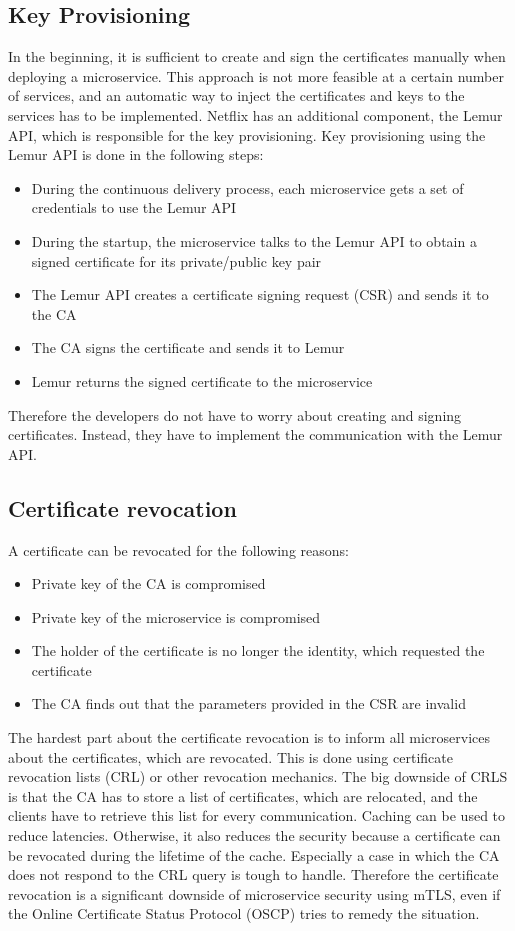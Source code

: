 \subsection{Key Provisioning}
In the beginning, it is sufficient to create and sign the certificates manually when deploying a microservice.
This approach is not more feasible at a certain number of services, and an automatic way to inject the certificates and keys to the services has to be implemented.
Netflix has an additional component, the Lemur API, which is responsible for the key provisioning. Key provisioning using the Lemur API is done in the following steps\cite{dias2020microservices}: %
\begin{itemize}
    \item During the continuous delivery process, each microservice gets a set of credentials to use the Lemur API
    \item During the startup, the microservice talks to the Lemur API to obtain a signed certificate for its private/public key pair
    \item The Lemur API creates a certificate signing request (CSR) and sends it to the CA
    \item The CA signs the certificate and sends it to Lemur
    \item Lemur returns the signed certificate to the microservice
\end{itemize}
Therefore the developers do not have to worry about creating and signing certificates. Instead, they have to implement the communication with the Lemur API.

\subsection{Certificate revocation}
A certificate can be revocated for the following reasons: 
\begin{itemize}
    \item Private key of the CA is compromised
    \item Private key of the microservice is compromised
    \item The holder of the certificate is no longer the identity, which requested the certificate 
    \item The CA finds out that the parameters provided in the CSR are invalid
\end{itemize}
The hardest part about the certificate revocation is to inform all microservices about the certificates, which are revocated. This is done using certificate revocation lists (CRL) or other revocation mechanics. The big downside of CRLS is that the CA has to store a list of certificates, which are relocated, and the clients have to retrieve this list for every communication. Caching can be used to reduce latencies. Otherwise, it also reduces the security because a certificate can be revocated during the lifetime of the cache. Especially a case in which the CA does not respond to the CRL query is tough to handle. Therefore the certificate revocation is a significant downside of microservice security using mTLS, even if the Online Certificate Status Protocol (OSCP) tries to remedy the situation\cite{dias2020microservices}.

